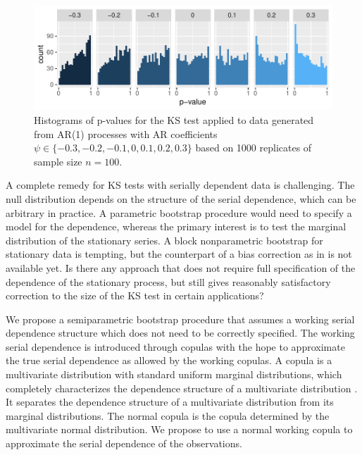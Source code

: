 \documentclass[12pt, letterpaper, titlepage]{article}
\begin{document}
\begin{figure}[tbp]
  \centering
  \includegraphics[width=\textwidth]{hist_correlation}
  \caption{Histograms of p-values for the KS test applied to data generated from
    AR(1) processes with AR coefficients
    $\psi \in \{-0.3, -0.2, -0.1, 0, 0.1, 0.2, 0.3\}$
    based on 1000 replicates of sample size $n = 100$.}
  \label{fig:hist_correlation}
\end{figure}


A complete remedy for KS tests with serially dependent data is
challenging. The null distribution depends on the structure of the serial
dependence, which can be arbitrary in practice. A parametric bootstrap procedure
would need to specify a model for the dependence, whereas the primary interest
is to test the marginal distribution of the stationary series. A block
nonparametric bootstrap for stationary data \citep{kunsch1989jackknife} is
tempting, but the counterpart of a bias correction as in
\citet{babu2004goodness} is not available yet. Is there any approach that does
not require full specification of the dependence of the stationary process,
but still gives reasonably satisfactory correction to the size of the KS test in
certain applications?


We propose a semiparametric bootstrap procedure that assumes a working serial
dependence structure which does not need to be correctly specified. The working
serial dependence is introduced through copulas with the hope to approximate the
true serial dependence as allowed by the working copulas. A copula is a
multivariate distribution with standard uniform marginal distributions, which
completely characterizes the dependence structure of a multivariate
distribution \citep{hofert2018elements}. It separates the dependence structure
of a multivariate distribution from its marginal distributions. The normal copula
is the copula determined by the multivariate normal distribution. We propose to
use a normal working copula to approximate the serial
dependence of the observations.
\end{document}
